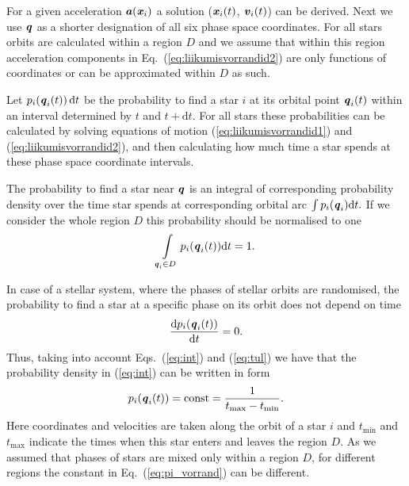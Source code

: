 \documentclass[fleqn,usenatbib]{mnras}
\begin{document}
For a given acceleration $\textbf{\textit{a}}(\textbf{\textit{x}}_i)$ a solution ($\textbf{\textit{x}}_i(t)$, $\textbf{\textit{v}}_i(t)$) can be derived. Next we use  $\textbf{\textit{q}}$ as a shorter designation of all six phase space coordinates. For all stars orbits are calculated within a region $D$ and we assume that within this region acceleration components in Eq.~(\ref{eq:liikumisvorrandid2}) are only functions of coordinates or can be approximated within $D$ as such.

Let $p_i (\textbf{\textit{q}}_i(t))\, \text{d}t$ be the probability to find a star $i$ at its orbital point $\textbf{\textit{q}}_i (t)$ within an interval determined by $t$ and $t + \text{d}t$. For all stars these probabilities can be calculated by solving equations of motion (\ref{eq:liikumisvorrandid1}) and (\ref{eq:liikumisvorrandid2}), and then calculating how much time a star spends at these phase space coordinate intervals. 

The probability to find a star near $\textbf{\textit{q}}$ is an integral of corresponding probability density over the time star spends at corresponding orbital arc $\int p_i (\textbf{\textit{q}}_i) \text{d}t.$ If we consider the whole region $D$ this probability should be normalised to one
\begin{equation}
\int\limits_{\textbf{\textit{q}}_i\in D} p_i(\textbf{\textit{q}}_i(t))\text{d}t = 1. \label{eq:int}
\end{equation}


In case of a stellar system, where the phases of stellar orbits are randomised, the probability to find a star at a specific phase on its orbit does not depend on time
\begin{equation}
\frac{\text{d}p_i( \textbf{\textit{q}}_i (t) )}{\text{d}t} = 0. \label{eq:tul}
\end{equation} 
Thus, taking into account Eqs.~(\ref{eq:int}) and (\ref{eq:tul}) we have that the probability density in (\ref{eq:int}) can be written in form
\begin{equation}
	p_i( \textbf{\textit{q}}_i (t) ) = \text{const} = \frac{1}{t_\text{max}-t_\text{min}}.  \label{eq:pi_vorrand}
\end{equation}
Here coordinates and velocities are taken along the orbit of a star $i$ and $t_\text{min}$ and $t_\text{max}$ indicate the times when this star enters and leaves the region $D$. As we assumed that phases of stars are mixed only within a region $D$, for different regions the constant in Eq.~(\ref{eq:pi_vorrand}) can be different.
\end{document}
